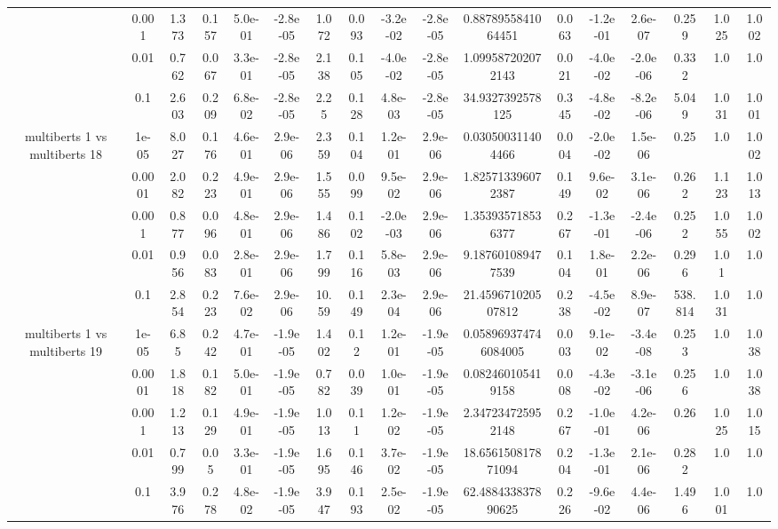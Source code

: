 \begin{tabular}{|c|c|c|c|c|c|c|c|c|c|c|c|c|c|c|c|c|}
 & 0.001 & 1.373 & 0.157 & 5.0e-01 & -2.8e-05 & 1.072 & 0.093 & -3.2e-02 & -2.8e-05 & 0.8878955841064451 & 0.063 & -1.2e-01 & 2.6e-07 & 0.259 & 1.025 & 1.002 \\
 & 0.01 & 0.762 & 0.067 & 3.3e-01 & -2.8e-05 & 2.138 & 0.105 & -4.0e-02 & -2.8e-05 & 1.099587202072143 & 0.021 & -4.0e-02 & -2.0e-06 & 0.332 & 1.0 & 1.0 \\
 & 0.1 & 2.603 & 0.209 & 6.8e-02 & -2.8e-05 & 2.25 & 0.128 & 4.8e-03 & -2.8e-05 & 34.9327392578125 & 0.345 & -4.8e-02 & -8.2e-06 & 5.049 & 1.031 & 1.001 \\
\hline
\multirow{5}{*}{multiberts 1 vs multiberts 18} & 1e-05 & 8.027 & 0.176 & 4.6e-01 & 2.9e-06 & 2.359 & 0.104 & 1.2e-01 & 2.9e-06 & 0.030500311404466 & 0.004 & -2.0e-02 & 1.5e-06 & 0.25 & 1.0 & 1.002 \\
 & 0.0001 & 2.082 & 0.223 & 4.9e-01 & 2.9e-06 & 1.555 & 0.099 & 9.5e-02 & 2.9e-06 & 1.825713396072387 & 0.149 & 9.6e-02 & 3.1e-06 & 0.262 & 1.123 & 1.013 \\
 & 0.001 & 0.877 & 0.096 & 4.8e-01 & 2.9e-06 & 1.486 & 0.102 & -2.0e-03 & 2.9e-06 & 1.353935718536377 & 0.267 & -1.3e-01 & -2.4e-06 & 0.252 & 1.055 & 1.002 \\
 & 0.01 & 0.956 & 0.083 & 2.8e-01 & 2.9e-06 & 1.799 & 0.116 & 5.8e-03 & 2.9e-06 & 9.187601089477539 & 0.104 & 1.8e-01 & 2.2e-06 & 0.296 & 1.01 & 1.0 \\
 & 0.1 & 2.854 & 0.223 & 7.6e-02 & 2.9e-06 & 10.59 & 0.149 & 2.3e-04 & 2.9e-06 & 21.459671020507812 & 0.238 & -4.5e-02 & 8.9e-07 & 538.814 & 1.031 & 1.0 \\
\hline
\multirow{5}{*}{multiberts 1 vs multiberts 19} & 1e-05 & 6.85 & 0.242 & 4.7e-01 & -1.9e-05 & 1.402 & 0.12 & 1.2e-01 & -1.9e-05 & 0.058969374746084005 & 0.003 & 9.1e-02 & -3.4e-08 & 0.253 & 1.0 & 1.038 \\
 & 0.0001 & 1.818 & 0.182 & 5.0e-01 & -1.9e-05 & 0.782 & 0.039 & 1.0e-01 & -1.9e-05 & 0.082460105419158 & 0.008 & -4.3e-02 & -3.1e-06 & 0.256 & 1.0 & 1.038 \\
 & 0.001 & 1.213 & 0.129 & 4.9e-01 & -1.9e-05 & 1.013 & 0.11 & 1.2e-02 & -1.9e-05 & 2.347234725952148 & 0.267 & -1.0e-01 & 4.2e-06 & 0.26 & 1.025 & 1.015 \\
 & 0.01 & 0.799 & 0.05 & 3.3e-01 & -1.9e-05 & 1.695 & 0.146 & 3.7e-02 & -1.9e-05 & 18.656150817871094 & 0.204 & -1.3e-01 & 2.1e-06 & 0.282 & 1.0 & 1.0 \\
 & 0.1 & 3.976 & 0.278 & 4.8e-02 & -1.9e-05 & 3.947 & 0.193 & 2.5e-02 & -1.9e-05 & 62.488433837890625 & 0.226 & -9.6e-02 & 4.4e-06 & 1.496 & 1.001 & 1.0 \\

\end{tabular}

